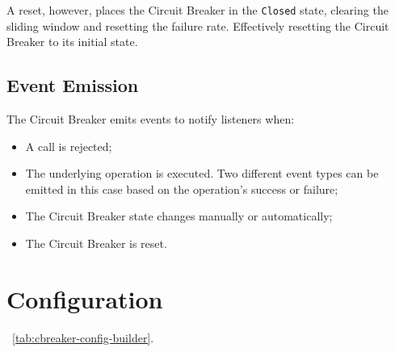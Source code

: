 A reset, however, places the Circuit Breaker in the \texttt{Closed} state,
clearing the sliding window and resetting the failure rate.
Effectively resetting the Circuit Breaker to its initial state.

\subsection{Event Emission}\label{subsec:cbreaker-event-emission}

The Circuit Breaker emits events to notify listeners when:

\begin{itemize}
    \item A call is rejected;
    \item The underlying operation is executed.
    Two different event types can be emitted in this case based on the operation's success or failure;
    \item The Circuit Breaker state changes manually or automatically;
    \item The Circuit Breaker is reset.
\end{itemize}


\section{Configuration}\label{sec:cbreaker-configuration}

~\ref{tab:cbreaker-config-builder}.

